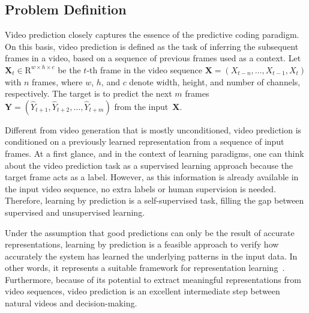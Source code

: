 
\subsection{Problem Definition}
Video prediction closely captures the essence of the predictive coding paradigm. On this basis, video prediction is defined as the task of inferring the subsequent frames in a video, based on a sequence of previous frames used as a context. Let ${\mathbf{X}_{t}\in\mathrm{R}^{w \times h \times c}}$ be the $t$-th frame in the video sequence ${\mathbf{X}=(X_{t-n},\ldots,X_{t-1},X_t)}$ with $n$ frames, where $w$, $h$, and $c$ denote width, height, and number of channels, respectively. The target is to predict the next $m$ frames ${\mathbf{Y}=(\hat{Y}_{t+1},\hat{Y}_{t+2},\ldots,\hat{Y}_{t+m})}$ from the input~$\mathbf{X}$.

Different from video generation that is mostly unconditioned, video prediction is conditioned on a previously learned representation from a sequence of input frames. At a first glance, and in the context of learning paradigms, one can think about the video prediction task as a supervised learning approach because the target frame acts as a label. However, as this information is already available in the input video sequence, no extra labels or human supervision is needed. Therefore, learning by prediction is a self-supervised task, filling the gap between supervised and unsupervised learning. 

Under the assumption that good predictions can only be the result of accurate representations, learning by prediction is a feasible approach to verify how accurately the system has learned the underlying patterns in the input data. In other words, it represents a suitable framework for representation learning~\cite{Bengio2013,Wang2015}. Furthermore, because of its potential to extract meaningful representations from video sequences, video prediction is an excellent intermediate step between natural videos and decision-making.

